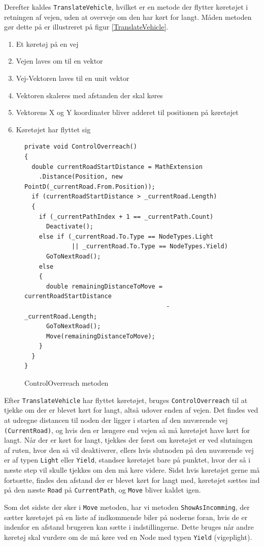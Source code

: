 \vspace{5mm}

Derefter kaldes \texttt{TranslateVehicle}, hvilket er en metode der flytter køretøjet i retningen af vejen, uden at overveje om den har kørt for langt. Måden metoden gør dette på er illustreret på figur \ref{TranslateVehicle}.

\begin{enumerate}
\item Et køretøj på en vej
\item Vejen laves om til en vektor
\item Vej-Vektoren laves til en unit vektor
\item Vektoren skaleres med afstanden der skal køres
\item Vektorens X og Y koordinater bliver adderet til positionen på køretøjet
\item Køretøjet har flyttet sig
\end{enumerate}

\begin{figure}[H]
\begin{lstlisting}
private void ControlOverreach()
{
  double currentRoadStartDistance = MathExtension
    .Distance(Position, new PointD(_currentRoad.From.Position));
  if (currentRoadStartDistance > _currentRoad.Length)
  {
    if (_currentPathIndex + 1 == _currentPath.Count)
      Deactivate();
    else if (_currentRoad.To.Type == NodeTypes.Light 
             || _currentRoad.To.Type == NodeTypes.Yield)
      GoToNextRoad();
    else
    {
      double remainingDistanceToMove = currentRoadStartDistance 
                                       - _currentRoad.Length;
      GoToNextRoad();
      Move(remainingDistanceToMove);
    }
  }
}
\end{lstlisting}
\caption{ControlOverreach metoden}\label{ControlOverreachCode}
\end{figure}

Efter \texttt{TranslateVehicle} har flyttet køretøjet, bruges \texttt{ControlOverreach} til at tjekke om der er blevet kørt for langt, altså udover enden af vejen. Det findes ved at udregne distancen til noden der ligger i starten af den nuværende vej \texttt{(CurrentRoad)}, og hvis den er længere end vejen så må køretøjet have kørt for langt. Når der er kørt for langt, tjekkes der først om køretøjet er ved slutningen af ruten, hvor den så vil deaktiverer, ellers hvis slutnoden på den nuværende vej er af typen \texttt{Light} eller \texttt{Yield}, standser køretøjet bare på punktet, hvor der så i næste step vil skulle tjekkes om den må køre videre. Sidst hvis køretøjet gerne må fortsætte, findes den afstand der er blevet kørt for langt med, køretøjet sættes ind på den næste \texttt{Road} på \texttt{CurrentPath}, og \texttt{Move} bliver kaldet igen.

\vspace{5mm}

Som det sidste der sker i \texttt{Move} metoden, har vi metoden \texttt{ShowAsIncomming}, der sætter køretøjet på en liste af indkommende biler på noderne foran, hvis de er indenfor en afstand brugeren kan sætte i indstillingerne. Dette bruges når andre køretøj skal vurdere om de må køre ved en Node med typen \texttt{Yield} (vigeplight).